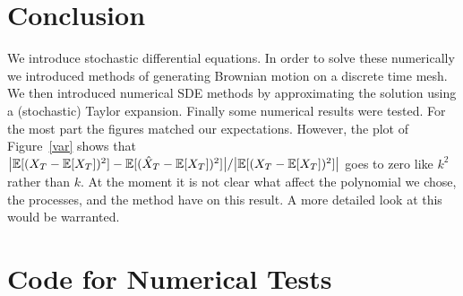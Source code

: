 \documentclass[12pt]{article}
\begin{document}
\section{Conclusion}
We introduce stochastic differential equations. In order to solve these numerically we introduced methods of generating Brownian motion on a discrete time mesh. We then introduced numerical SDE methods by approximating the solution using a (stochastic) Taylor expansion. Finally some numerical results were tested. For the most part the figures matched our expectations. However, the plot of Figure~\ref{var} shows that \( \big|\mathbb{E}[(X_T-\mathbb{E}[X_T])^2] - \mathbb{E}[(\hat{X}_T-\mathbb{E}[X_T])^2]\big|/\big|\mathbb{E}[(X_T-\mathbb{E}[X_T])^2]\big| \) goes to zero like \( k^2 \) rather than \( k \). At the moment it is not clear what affect the polynomial we chose, the processes, and the method have on this result. A more detailed look at this would be warranted.


{}


\pagebreak
\section{Code for Numerical Tests}

\end{document}
